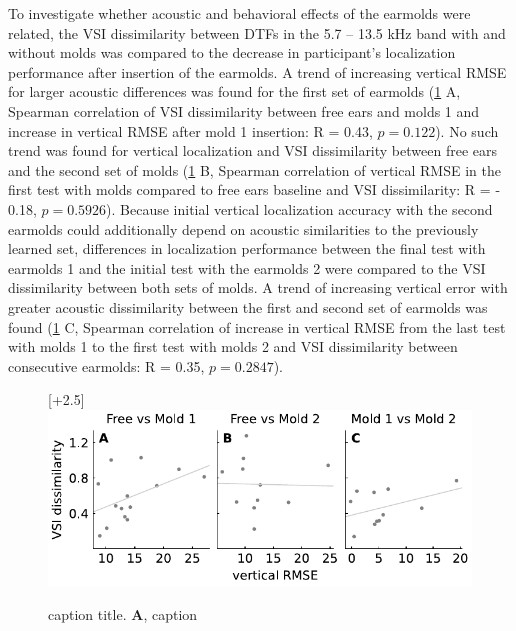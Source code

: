 To investigate whether acoustic and behavioral effects of the earmolds were related, the VSI dissimilarity between DTFs in the 5.7 – 13.5 kHz band with and without molds was compared to the decrease in participant’s localization performance after insertion of the earmolds. A trend of increasing vertical RMSE for larger acoustic differences was found for the first set of earmolds (\cref{fig:vsi_dis_rmse} A, Spearman correlation of VSI dissimilarity between free ears and molds 1 and increase in vertical RMSE after mold 1 insertion: R = 0.43, $p = 0.122$). No such trend was found for vertical localization and VSI dissimilarity between free ears and the second set of molds (\cref{fig:vsi_dis_rmse} B, Spearman correlation of vertical RMSE in the first test with molds compared to free ears baseline and VSI dissimilarity: R = - 0.18, $p = 0.5926$). Because initial vertical localization accuracy with the second earmolds could additionally depend on acoustic similarities to the previously learned set, differences in localization performance between the final test with earmolds 1 and the initial test with the earmolds 2 were compared to the VSI dissimilarity between both sets of molds. A trend of increasing vertical error with greater acoustic dissimilarity between the first and second set of earmolds was found (\cref{fig:vsi_dis_rmse} C, Spearman correlation of increase in vertical RMSE from the last test with molds 1 to the first test with molds 2 and VSI dissimilarity between consecutive earmolds: R = 0.35, $p = 0.2847$).

 \begin{figure}
\centering
    \raisebox{0pt}[\dimexpr\height+2.5\baselineskip\relax]{
        \includegraphics[width=12cm]{../Results/figures/fig6/fig6}}
	\caption{caption title. \textbf{A}, caption}
	\label{fig:vsi_dis_rmse}
\end{figure}
\noindent%

 
